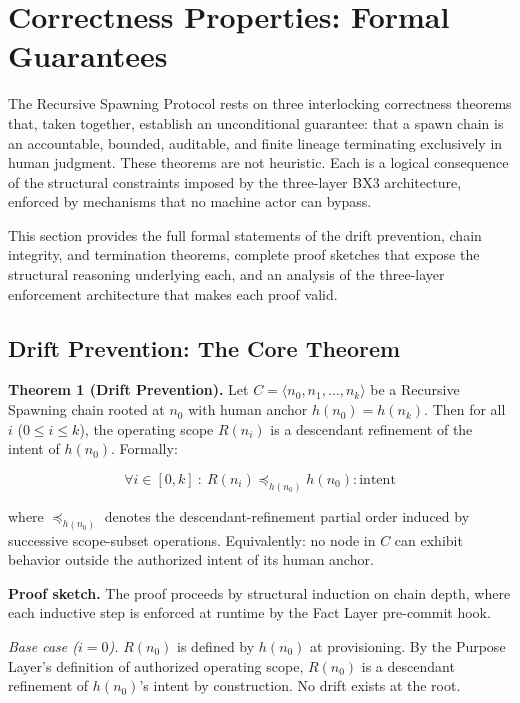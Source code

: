 \section{Correctness Properties: Formal Guarantees}
\label{sec:rs-correctness-formal}

The Recursive Spawning Protocol rests on three interlocking correctness theorems that, taken together, establish an unconditional guarantee: that a spawn chain is an accountable, bounded, auditable, and finite lineage terminating exclusively in human judgment. These theorems are not heuristic. Each is a logical consequence of the structural constraints imposed by the three-layer BX3 architecture, enforced by mechanisms that no machine actor can bypass.

This section provides the full formal statements of the drift prevention, chain integrity, and termination theorems, complete proof sketches that expose the structural reasoning underlying each, and an analysis of the three-layer enforcement architecture that makes each proof valid.

\subsection{Drift Prevention: The Core Theorem}
\label{sec:rs-drift-prevention-formal}

\medskip
\noindent\textbf{Theorem 1 (Drift Prevention).} Let $C = \langle n_0, n_1, \ldots, n_k \rangle$ be a Recursive Spawning chain rooted at $n_0$ with human anchor $h(n_0) = h(n_k)$. Then for all $i$ ($0 \leq i \leq k$), the operating scope $R(n_i)$ is a descendant refinement of the intent of $h(n_0)$. Formally:

\[
\forall i \in [0, k]\ :\ R(n_i) \preceq_{h(n_0)} h(n_0)\mathrm{:intent}
\]

where $\preceq_{h(n_0)}$ denotes the descendant-refinement partial order induced by successive scope-subset operations. Equivalently: no node in $C$ can exhibit behavior outside the authorized intent of its human anchor.

\medskip
\noindent\textbf{Proof sketch.} The proof proceeds by structural induction on chain depth, where each inductive step is enforced at runtime by the Fact Layer pre-commit hook.

\medskip
\textit{Base case ($i=0$).} $R(n_0)$ is defined by $h(n_0)$ at provisioning. By the Purpose Layer's definition of authorized operating scope, $R(n_0)$ is a descendant refinement of $h(n_0)$'s intent by construction. No drift exists at the root.

